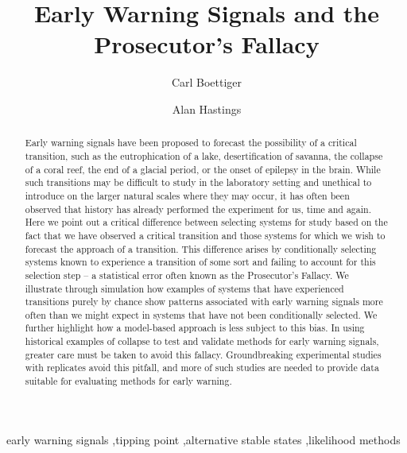 \documentclass[authoryear,review,12pt]{elsarticle}
\begin{document}
\begin{frontmatter}
  \title{Early Warning Signals and the Prosecutor's Fallacy}
  \author[cpb]{Carl Boettiger}
  \author[esp]{Alan Hastings}
  \address[cpb]{Center for Population Biology, 1 Shields Avenue, University of California, Davis, CA, 95616 United States.}
  \address[esp]{Department of Environmental Science and Policy, University of California, Davis} 


  \begin{abstract}

  Early warning signals have been proposed to forecast the possibility of a 
  critical transition, such as the eutrophication of a lake, desertification
  of savanna, the collapse of a coral reef, the end of a glacial period, or 
  the onset of epilepsy in the brain.  While such transitions may be difficult
  to study in the laboratory setting and unethical to introduce on the larger
  natural scales where they may occur, it has often been observed that history
  has already performed the experiment for us, time and again.  Here we point 
  out a critical difference between selecting systems for study based on the 
  fact that we have observed a critical transition and those systems for which
  we wish to forecast the approach of a transition. This difference arises
  by conditionally selecting systems known to experience a transition of some 
  sort and failing to account for this selection step -- a statistical error 
  often known as the Prosecutor's
  Fallacy.  We illustrate through simulation how examples of systems that have 
  experienced transitions purely by chance show patterns associated with 
  early warning signals more often than we might expect in systems that have not
  been conditionally selected.  We further highlight how a model-based approach
  is less subject to this bias.  In using historical examples of collapse to 
  test and validate methods for early warning signals, greater care must be taken
  to avoid this fallacy.  Groundbreaking experimental studies with replicates
  avoid this pitfall, and more of such studies are needed to provide data
  suitable for evaluating methods for early warning.  
 
  \end{abstract}

  \begin{keyword}
early warning signals \sep tipping point \sep alternative stable states \sep likelihood methods 
   \end{keyword}
 \end{frontmatter}
\end{document}
